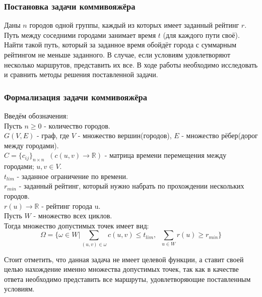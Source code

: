 \subsubsection{Постановка задачи коммивояжёра}
Даны $n$ городов одной группы, каждый из которых имеет заданный рейтинг $r$. Путь между соседними городами занимает время $t$ (для каждого пути своё). Найти такой путь, который за заданное время обойдёт города с суммарным рейтингом не меньше заданного. В случае, если условиям удовлетворяют несколько маршрутов, представить их все. В ходе работы необходимо исследовать и сравнить методы решения поставленной задачи.


\subsubsection{Формализация задачи коммивояжёра}
Введём обозначения:\\
Пусть $n\geq{0}$ - количество городов.\\
$G(V,E)$ - граф, где $V$ - множество вершин(городов), $E$ - множество рёбер(дорог между городами).\\
$C = \{c_{ij}\}_{n \times n}\;\; (c(u, v)\rightarrow\mathbb{R})$ - матрица времени перемещения между городами; $u, v \in V$.\\
$t_{lim}$ - заданное ограничение по времени.\\
$r_{min}$ - заданный рейтинг, который нужно набрать по прохождении нескольких городов.\\
$r(u)\rightarrow \mathbb{R}$ - рейтинг города u.\\
Пусть $W$ - множество всех циклов.\\
Тогда множество допустимых точек имеет вид:\\
$$\Omega = \{\omega \in W | \sum_{(u,v)\in \omega}c(u, v)\leq{t_{lim}},\;\; \sum_{u \in W} r(u)\geq{r_{min}}\}$$

Стоит отметить, что данная задача не имеет целевой функции, а ставит своей целью нахождение именно множества допустимых точек, так как в качестве ответа необходимо представить все маршруты, удовлетворяющие поставленным условиям.


